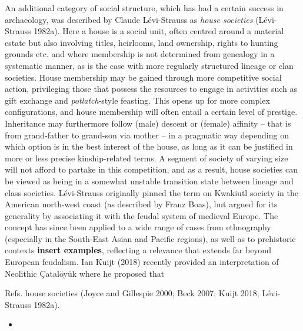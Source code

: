 \documentclass[
  12pt,
  a4paper, twoside]{book}
\providecommand{\tightlist}{%
  \setlength{\itemsep}{0pt}\setlength{\parskip}{0pt}}
\begin{document}
An additional category of social structure, which has had a certain success in archaeology, was described by Claude Lévi-Strauss as \emph{house societies} (Lévi-Strauss 1982a). Here a house is a social unit, often centred around a material estate but also involving titles, heirlooms, land ownership, rights to hunting grounds etc. and where membership is not determined from genealogy in a systematic manner, as is the case with more regularly structured lineage or clan societies. House membership may be gained through more competitive social action, privileging those that possess the resources to engage in activities such as gift exchange and \emph{potlatch}-style feasting. This opens up for more complex configurations, and house membership will often entail a certain level of prestige. Inheritance may furthermore follow (male) descent or (female) affinity -- that is from grand-father to grand-son via mother -- in a pragmatic way depending on which option is in the best interest of the house, as long as it can be justified in more or less precise kinship-related terms. A segment of society of varying size will not afford to partake in this competition, and as a result, house societies can be viewed as being in a somewhat unstable transition state between lineage and class societies. Lévi-Strauss originally pinned the term on Kwakiutl society in the American north-west coast (as described by Franz Boas), but argued for its generality by associating it with the feudal system of medieval Europe. The concept has since been applied to a wide range of cases from ethnography (especially in the South-East Asian and Pacific regions), as well as to prehistoric contexts \textbf{insert examples}, reflecting a relevance that extends far beyond European feudalism. Ian Kuijt (2018) recently provided an interpretation of Neolithic Çatalöyük where he proposed that

Refs. house societies (Joyce and Gillespie 2000; Beck 2007; Kuijt 2018; Lévi-Strauss 1982a).

\begin{itemize}
\tightlist
\item
\end{itemize}
\end{document}
